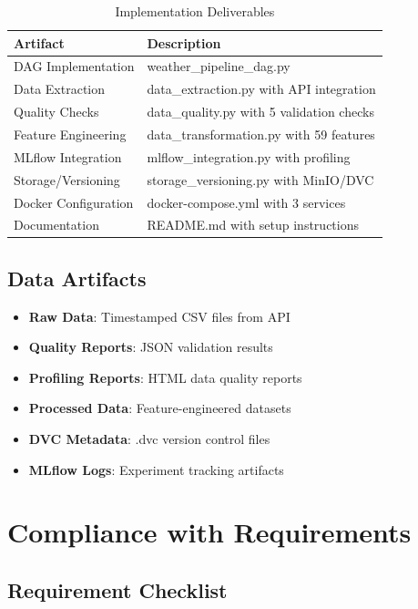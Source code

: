 \documentclass[12pt,a4paper]{article}
\begin{document}
\begin{table}[H]
\centering
\begin{tabular}{|l|p{8cm}|}
\hline
\textbf{Artifact} & \textbf{Description} \\
\hline
DAG Implementation & weather\_pipeline\_dag.py \\
Data Extraction & data\_extraction.py with API integration \\
Quality Checks & data\_quality.py with 5 validation checks \\
Feature Engineering & data\_transformation.py with 59 features \\
MLflow Integration & mlflow\_integration.py with profiling \\
Storage/Versioning & storage\_versioning.py with MinIO/DVC \\
Docker Configuration & docker-compose.yml with 3 services \\
Documentation & README.md with setup instructions \\
\hline
\end{tabular}
\caption{Implementation Deliverables}
\label{tab:deliverables}
\end{table}

\subsection{Data Artifacts}

\begin{itemize}
    \item \textbf{Raw Data}: Timestamped CSV files from API
    \item \textbf{Quality Reports}: JSON validation results
    \item \textbf{Profiling Reports}: HTML data quality reports
    \item \textbf{Processed Data}: Feature-engineered datasets
    \item \textbf{DVC Metadata}: .dvc version control files
    \item \textbf{MLflow Logs}: Experiment tracking artifacts
\end{itemize}

\section{Compliance with Requirements}

\subsection{Requirement Checklist}
\end{document}
